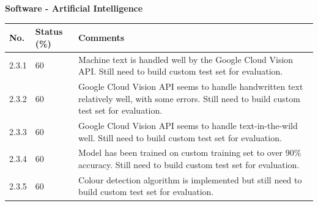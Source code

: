 \documentclass[a4paper,11pt]{article}
\begin{document}
\textbf{Software - Artificial Intelligence}
\begin{table}[ht]
    \centering
    \begin{tabular}{|p{0.7cm}|p{1cm}|p{12cm}|}
        \hline
        No. & Status (\%) & Comments \\ \hline
        
        2.3.1 & 60 & Machine text is handled well by the Google Cloud Vision API. Still need to build custom test set for evaluation. \\ \hline
        
        2.3.2 & 60 & Google Cloud Vision API seems to handle handwritten text relatively well, with some errors. Still need to build custom test set for evaluation. \\ \hline
        
        2.3.3 & 60 & Google Cloud Vision API seems to handle text-in-the-wild well. Still need to build custom test set for evaluation. \\ \hline
        
        2.3.4 & 60 & Model has been trained on custom training set to over 90\% accuracy. Still need to build custom test set for evaluation. \\ \hline
        
        2.3.5 & 60 & Colour detection algorithm is implemented but still need to build custom test set for evaluation. \\ \hline
    \end{tabular}
\end{table}
\end{document}
